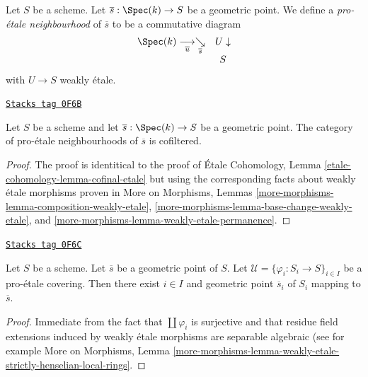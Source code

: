 Let $S$ be a scheme. Let $\overline{s} : \Spec(k) \to S$ be a geometric
point. We define a {\it pro-\'etale neighbourhood} of $\overline{s}$
to be a commutative diagram
$$
\begin{array}{cc}\Spec(k) \underset{\overline{u}}{\longrightarrow}\underset{\overline{s}}{\searrow} & U \downarrow \\  & S\end{array}
$$
with $U \to S$ weakly \'etale.

\begin{lemma}
\label{proetale-lemma-cofinal-etale}
\href{https://stacks.math.columbia.edu/tag/0F6B}{\texttt{Stacks tag 0F6B}}

Let $S$ be a scheme and let $\overline{s} : \Spec(k) \to S$ be a
geometric point. The category of pro-\'etale neighbourhoods of
$\overline{s}$ is cofiltered.
\end{lemma}

\begin{proof}
The proof is identitical to the proof of
\'Etale Cohomology, Lemma \ref{etale-cohomology-lemma-cofinal-etale}
but using the corresponding facts about weakly \'etale morphisms
proven in
More on Morphisms, Lemmas
\ref{more-morphisms-lemma-composition-weakly-etale},
\ref{more-morphisms-lemma-base-change-weakly-etale}, and
\ref{more-morphisms-lemma-weakly-etale-permanence}.
\end{proof}

\begin{lemma}
\label{proetale-lemma-geometric-lift-to-cover}
\href{https://stacks.math.columbia.edu/tag/0F6C}{\texttt{Stacks tag 0F6C}}

Let $S$ be a scheme. Let $\overline{s}$ be a geometric point of $S$.
Let $\mathcal{U} = \{\varphi_i : S_i \to S\}_{i\in I}$ be a
pro-\'etale covering. Then there exist $i \in I$ and geometric
point $\overline{s}_i$ of $S_i$ mapping to $\overline{s}$.
\end{lemma}

\begin{proof}
Immediate from the fact that $\coprod \varphi_i$ is surjective
and that residue field extensions induced by weakly \'etale
morphisms are separable algebraic (see for example
More on Morphisms, Lemma
\ref{more-morphisms-lemma-weakly-etale-strictly-henselian-local-rings}.
\end{proof}

